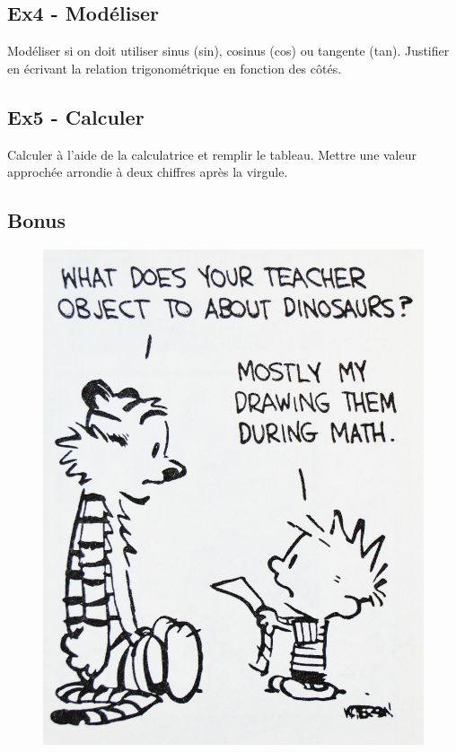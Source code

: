 \documentclass[12pt]{article}
\begin{document}
\subsection*{Ex4 - Modéliser}

Modéliser si on doit utiliser sinus (sin), cosinus (cos) ou tangente (tan). Justifier en écrivant la relation trigonométrique en fonction des côtés.

\subsection*{Ex5 - Calculer}

Calculer à l'aide de la calculatrice et remplir le tableau. Mettre une valeur approchée arrondie à deux chiffres après la virgule. 


\subsection*{Bonus}


  \begin{figure}[H]
    \centering
    \includegraphics[width=0.6 \linewidth]{4x1-pythagore/sources/cah.jpg}
  \end{figure}
\end{document}
